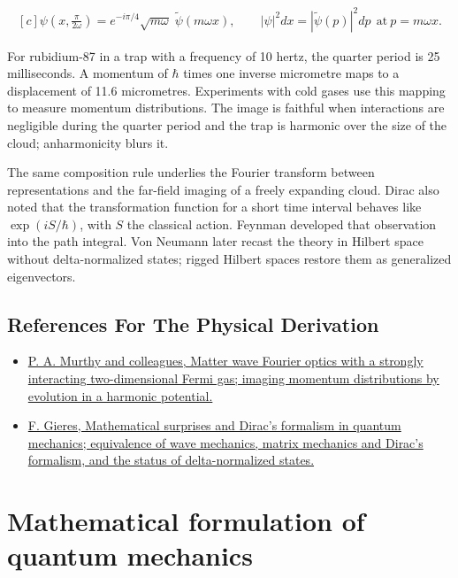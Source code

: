 \documentclass[11pt,oneside]{book}
\newenvironment{centeredalign}{\[\begin{gathered}[c]}{\end{gathered}\]}
\begin{document}
\begin{centeredalign}
\psi\!\left(x,\frac{\pi}{2\omega}\right)=e^{-i\pi/4}\sqrt{m\omega}\;\widetilde\psi(m\omega x),
\qquad |\psi|^2dx=|\widetilde\psi(p)|^2dp\ \ \text{at}\ p=m\omega x.
\end{centeredalign}

For rubidium-87 in a trap with a frequency of 10 hertz, the quarter period is 25 milliseconds. A momentum of \(\hbar\) times one inverse micrometre maps to a displacement of 11.6 micrometres. Experiments with cold gases use this mapping to measure momentum distributions. The image is faithful when interactions are negligible during the quarter period and the trap is harmonic over the size of the cloud; anharmonicity blurs it.

The same composition rule underlies the Fourier transform between representations and the far-field imaging of a freely expanding cloud. Dirac also noted that the transformation function for a short time interval behaves like \(\exp(iS/\hbar)\), with \(S\) the classical action. Feynman developed that observation into the path integral. Von Neumann later recast the theory in Hilbert space without delta-normalized states; rigged Hilbert spaces restore them as generalized eigenvectors.

\subsection*{References For The Physical Derivation}
\begin{itemize}
\item \href{https://arxiv.org/abs/1408.4680}{P. A. Murthy and colleagues, Matter wave Fourier optics with a strongly interacting two-dimensional Fermi gas; imaging momentum distributions by evolution in a harmonic potential.}
\item \href{https://arxiv.org/abs/quant-ph/9907069}{F. Gieres, Mathematical surprises and Dirac's formalism in quantum mechanics; equivalence of wave mechanics, matrix mechanics and Dirac's formalism, and the status of delta-normalized states.}
\end{itemize}





\clearpage

\section{Mathematical formulation of quantum mechanics}
\end{document}
